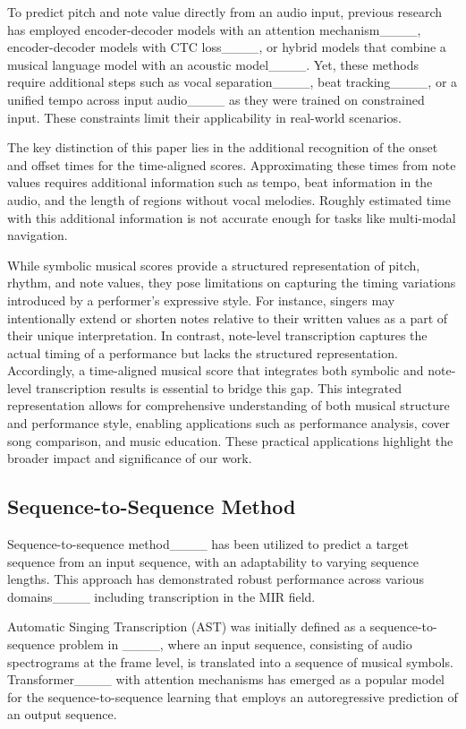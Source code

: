 To predict pitch and note value directly from an audio input, previous research has employed encoder-decoder models with an attention mechanism____, encoder-decoder models with CTC loss____, or hybrid models that combine a musical language model with an acoustic model____. Yet, these methods require additional steps such as vocal separation____, beat tracking____, or a unified tempo across input audio____ as they were trained on constrained input. These constraints limit their applicability in real-world scenarios.

The key distinction of this paper lies in the additional recognition of the onset and offset times for the time-aligned scores. Approximating these times from note values requires additional information such as tempo, beat information in the audio, and the length of regions without vocal melodies. Roughly estimated time with this additional information is not accurate enough for tasks like multi-modal navigation. 

While symbolic musical scores provide a structured representation of pitch, rhythm, and note values, they pose limitations on capturing the timing variations introduced by a performer's expressive style. For instance, singers may intentionally extend or shorten notes relative to their written values as a part of their unique interpretation. In contrast, note-level transcription captures the actual timing of a performance but lacks the structured representation. Accordingly, a time-aligned musical score that integrates both symbolic and note-level transcription results is essential to bridge this gap.
This integrated representation allows for comprehensive understanding of both musical structure and performance style, enabling applications such as performance analysis, cover song comparison, and music education. These practical applications highlight the broader impact and significance of our work. 

\subsection{Sequence-to-Sequence Method}
Sequence-to-sequence method____ has been utilized to predict a target sequence from an input sequence, with an adaptability to varying sequence lengths. This approach has demonstrated robust performance across various domains____ including transcription in the MIR field. 

Automatic Singing Transcription (AST) was initially defined as a sequence-to-sequence problem in ____, where an input sequence, consisting of audio spectrograms at the frame level, is translated into a sequence of musical symbols. 
Transformer____ with attention mechanisms has emerged as a popular model for the sequence-to-sequence learning that employs an autoregressive prediction of an output sequence. 


